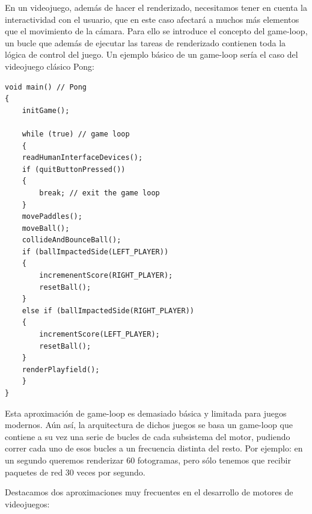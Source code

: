 \documentclass[a4paper,12pt]{report}
\begin{document}
	

	
	En un videojuego, además de hacer el renderizado, necesitamos tener en cuenta la interactividad con el usuario, que en este caso afectará a muchos más elementos que el movimiento de la cámara. %
	Para ello se introduce el concepto del game-loop, un bucle que además de ejecutar las tareas de renderizado contienen toda la lógica de control del juego. Un ejemplo básico de un game-loop sería el caso del videojuego clásico Pong:
	

	
		\begin{lstlisting}[style=C, numbers=none]
void main() // Pong
{
	initGame();
		
	while (true) // game loop
	{
	readHumanInterfaceDevices();
	if (quitButtonPressed())
	{
		break; // exit the game loop
	}
	movePaddles();
	moveBall();
	collideAndBounceBall();
	if (ballImpactedSide(LEFT_PLAYER))
	{
		incremenentScore(RIGHT_PLAYER);
		resetBall();
	}
	else if (ballImpactedSide(RIGHT_PLAYER))
	{
		incrementScore(LEFT_PLAYER);
		resetBall();
	}
	renderPlayfield();
	}
}
	\end{lstlisting}
	
	Esta aproximación de game-loop es demasiado básica y limitada para juegos modernos. Aún así, la arquitectura de dichos juegos se basa un game-loop que contiene a su vez una serie de bucles de cada subsistema del motor, pudiendo correr cada uno de esos bucles a un frecuencia distinta del resto. Por ejemplo: en un segundo queremos renderizar 60 fotogramas, pero sólo tenemos que recibir paquetes de red 30 veces por segundo. 
	
	Destacamos dos aproximaciones muy frecuentes en el desarrollo de motores de videojuegos:
	
\end{document}
